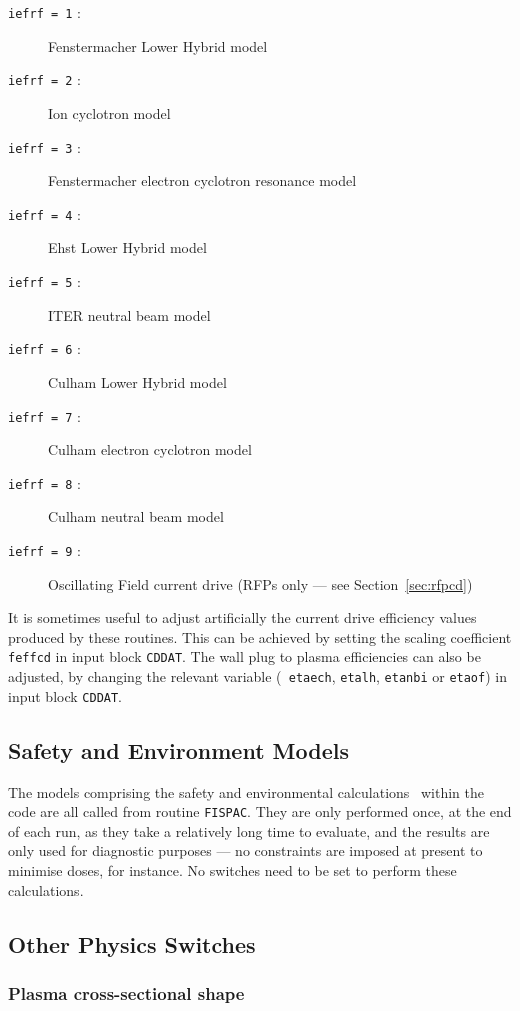 \begin{description}
\item [{\tt iefrf = 1} :] Fenstermacher Lower Hybrid model
\item [{\tt iefrf = 2} :] Ion cyclotron model~\cite{IPDG}
\item [{\tt iefrf = 3} :] Fenstermacher electron cyclotron resonance model
\item [{\tt iefrf = 4} :] Ehst Lower Hybrid model
\item [{\tt iefrf = 5} :] ITER neutral beam model~\cite{IPDG,172}
\item [{\tt iefrf = 6} :] Culham Lower Hybrid model~\cite{172}
\item [{\tt iefrf = 7} :] Culham electron cyclotron model~\cite{172}
\item [{\tt iefrf = 8} :] Culham neutral beam model~\cite{172}
\item [{\tt iefrf = 9} :] Oscillating Field current drive (RFPs only --- see
Section~\ref{sec:rfpcd})
\end{description}

It is sometimes useful to adjust artificially the current drive efficiency
values produced by these routines. This can be achieved by setting the scaling
coefficient {\tt feffcd} in input block {\tt CDDAT}. The wall plug to plasma
efficiencies can also be adjusted, by changing the relevant variable ({\tt
etaech}, {\tt etalh}, {\tt etanbi} or {\tt etaof}) in input block {\tt CDDAT}.

\subsection{Safety and Environment Models}

The models comprising the safety and environmental calculations~\cite{FISPACT}
within the code are all called from routine {\tt FISPAC}. They are only
performed once, at the end of each run, as they take a relatively long time to
evaluate, and the results are only used for diagnostic purposes --- no
constraints are imposed at present to minimise doses, for instance. No
switches need to be set to perform these calculations.

\subsection{Other Physics Switches}

\subsubsection{Plasma cross-sectional shape}

